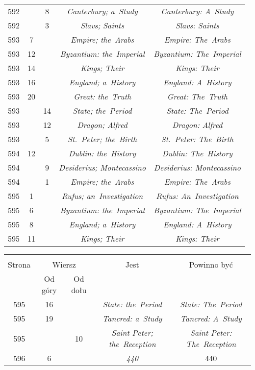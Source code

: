 \documentclass[a4paper,11pt]{article}
\begin{document}
\begin{center}
\begin{tabular}{|c|c|c|c|c|}
    592 & &  8 & \emph{Canterbury; a~Study} & \emph{Canterbury: A~Study} \\
    592 & &  3 & \emph{Slavs; Saints} & \emph{Slavs: Saints} \\
    593 &  7 & & \emph{Empire; the~Arabs} & \emph{Empire: The~Arabs} \\
    593 & 12 & & \emph{Byzantium: the~Imperial}
           & \emph{Byzantium: The~Imperial} \\
    593 & 14 & & \emph{Kings; Their} & \emph{Kings: Their} \\
    593 & 16 & & \emph{England; a~History} & \emph{England: A~History} \\
    593 & 20 & & \emph{Great: the~Truth} & \emph{Great: The~Truth} \\
    593 & & 14 & \emph{State; the~Period} & \emph{State: The~Period} \\
    593 & & 12 & \emph{Dragon; Alfred} & \emph{Dragon: Alfred} \\
    593 & &  5 & \emph{St.~Peter; the~Birth}
           & \emph{St.~Peter: The~Birth} \\
    594 & 12 & & \emph{Dublin: the~History} & \emph{Dublin: The~History} \\
    594 & &  9 & \emph{Desiderius; Montecassino}
           & \emph{Desiderius: Montecassino} \\
    594 & &  1 & \emph{Empire; the~Arabs} & \emph{Empire: The~Arabs} \\
    595 &  1 & & \emph{Rufus; an~Investigation}
           & \emph{Rufus: An~Investigation} \\
    595 &  6 & & \emph{Byzantium: the~Imperial}
           & \emph{Byzantium: The~Imperial} \\
    595 &  8 & & \emph{England; a~History} & \emph{England: A~History} \\
    595 & 11 & & \emph{Kings; Their} & \emph{Kings: Their} \\
    \hline
  \end{tabular}

  \begin{tabular}{|c|c|c|c|c|}
    \hline
    & \multicolumn{2}{c|}{} & & \\
    Strona & \multicolumn{2}{c|}{Wiersz}& Jest & Powinno być \\ \cline{2-3}
    & Od góry & Od dołu &  &  \\ \hline
    595 & 16 & & \emph{State: the~Period} & \emph{State: The~Period} \\
    595 & 19 & & \emph{Tancred: a~Study} & \emph{Tancred: A~Study} \\
    595 & & 10 & \emph{Saint Peter; the~Reception}
           & \emph{Saint Peter: The~Reception} \\
    596 &  6 & & \emph{440} & 440 \\
    \hline
  \end{tabular}
\end{center}
\end{document}

